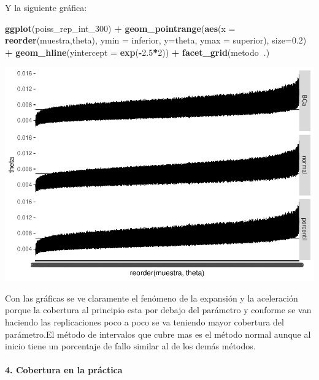 \documentclass[]{article}
\newenvironment{Shaded}{\begin{snugshade}}{\end{snugshade}}
\newcommand{\DataTypeTok}[1]{\textcolor[rgb]{0.13,0.29,0.53}{#1}}
\newcommand{\DecValTok}[1]{\textcolor[rgb]{0.00,0.00,0.81}{#1}}
\newcommand{\FloatTok}[1]{\textcolor[rgb]{0.00,0.00,0.81}{#1}}
\newcommand{\KeywordTok}[1]{\textcolor[rgb]{0.13,0.29,0.53}{\textbf{#1}}}
\newcommand{\NormalTok}[1]{#1}
\newcommand{\OperatorTok}[1]{\textcolor[rgb]{0.81,0.36,0.00}{\textbf{#1}}}
\newcommand{\StringTok}[1]{\textcolor[rgb]{0.31,0.60,0.02}{#1}}
\let\oldparagraph\paragraph
\renewcommand{\paragraph}[1]{\oldparagraph{#1}\mbox{}}
\begin{document}
Y la siguiente gráfica:

\begin{Shaded}
\begin{Highlighting}[]
  \KeywordTok{ggplot}\NormalTok{(poiss_rep_int_}\DecValTok{300}\NormalTok{) }\OperatorTok{+}
\StringTok{    }\KeywordTok{geom_pointrange}\NormalTok{(}\KeywordTok{aes}\NormalTok{(}\DataTypeTok{x =} \KeywordTok{reorder}\NormalTok{(muestra,theta),}
                        \DataTypeTok{ymin =}\NormalTok{ inferior,}
                        \DataTypeTok{y=}\NormalTok{theta,}
                        \DataTypeTok{ymax =}\NormalTok{ superior),}
                    \DataTypeTok{size=}\FloatTok{0.2}\NormalTok{) }\OperatorTok{+}
\StringTok{    }\KeywordTok{geom_hline}\NormalTok{(}\DataTypeTok{yintercept =} \KeywordTok{exp}\NormalTok{(}\OperatorTok{-}\FloatTok{2.5}\OperatorTok{*}\DecValTok{2}\NormalTok{)) }\OperatorTok{+}
\StringTok{    }\KeywordTok{facet_grid}\NormalTok{(metodo}\OperatorTok{~}\NormalTok{.)}
\end{Highlighting}
\end{Shaded}

\includegraphics{ExamenParcial_files/figure-latex/poisson grafica 300-1.pdf}

Con las gráficas se ve claramente el fenómeno de la expansión y la
aceleración porque la cobertura al principio esta por debajo del
parámetro y conforme se van haciendo las replicaciones poco a poco se va
teniendo mayor cobertura del parámetro.El método de intervalos que cubre
mas es el método normal aunque al inicio tiene un porcentaje de fallo
similar al de los demás métodos.

\hypertarget{cobertura-en-la-practica}{%
\paragraph{4. Cobertura en la práctica}\label{cobertura-en-la-practica}}
\end{document}
